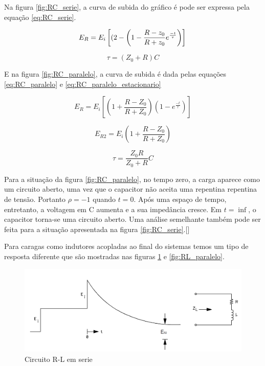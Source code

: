 Na figura \ref{fig:RC_serie}, a curva de subida do gráfico é pode ser expressa pela equação \ref{eq:RC_serie}.

\begin{equation}
\label{eq:RC_serie}
E_R = E_i\left[(2 - \left(1-\frac{R-z_0}{R+z_0}e^{\frac{-t}{\tau}}\right)\right] \\
\end{equation}

\begin{equation}
\tau = (Z_0+R)C
\end{equation}

E na figura \ref{fig:RC_paralelo}, a curva de subida é dada pelas equações \ref{eq:RC_paralelo} e \ref{eq:RC_paralelo_estacionario}

\begin{equation}
\label{eq:RC_paralelo}
E_R = E_i\left[\left( 1 + \frac{R-Z_0}{R+Z_0}\right)\left( 1 - e^{\frac{-t}{\tau}}\right)\right]
\end{equation}

\begin{equation}
\label{eq:RC_paralelo_estacionario}
E_{R2} = E_i \left(1+ \frac{R-Z_0}{R + Z_0}\right)
\end{equation}

\begin{equation}
\tau = \frac{Z_0R}{Z_0+R}C
\end{equation}

Para a situação da figura \ref{fig:RC_paralelo}, no tempo zero, a carga aparece como um circuito aberto, uma vez que o capacitor não aceita uma repentina repentina de tensão. Portanto $\rho = -1$ quando $t =0$. Após uma espaço de tempo, entretanto, a voltagem em C aumenta e a sua impedância cresce. Em $ t = \inf$, o capacitor torna-se uma circuito aberto. Uma análise semelhante também pode ser feita para a situação apresentada na figura \ref{fig:RC_serie}.[\cite{agilent}]

Para caragas como indutores acopladas ao final do sistemas temos um tipo de resposta diferente que são mostradas nas figuras \ref{fig:RL_serie} e \ref{fig:RL_paralelo}.

\begin{figure}[htb!]
	\begin{center}
		\includegraphics[scale=.30]{./cap2/figuras/R-L_serie_response.png}
		\caption{Circuito R-L em serie}
		\label{fig:RL_serie}
	\end{center}
\end{figure}

